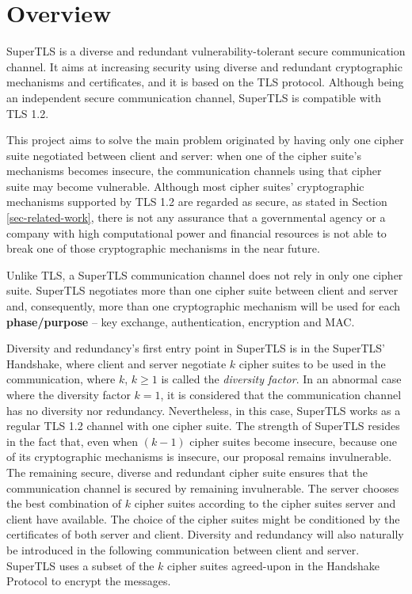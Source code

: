 \documentclass{sig-alternate-05-2015}
\begin{document}
\section{Overview}

SuperTLS is a diverse and redundant vulnerability-tolerant secure communication channel. It aims at increasing security using diverse and redundant cryptographic mechanisms and certificates, and it is based on the TLS protocol. Although being an independent secure communication channel, SuperTLS is compatible with TLS 1.2.

This project aims to solve the main problem originated by having only one cipher suite negotiated between client and server: when one of the cipher suite's mechanisms becomes insecure, the communication channels using that cipher suite may become vulnerable.
Although most cipher suites' cryptographic mechanisms supported by TLS 1.2 are regarded as secure, as stated in Section \ref{sec-related-work}, there is not any assurance that a governmental agency or a company with high computational power and financial resources is not able to break one of those cryptographic mechanisms in the near future.

Unlike TLS, a SuperTLS communication channel does not rely in only one cipher suite. SuperTLS negotiates more than one cipher suite between client and server and, consequently, more than one cryptographic mechanism will be used for each \textbf{phase/purpose} -- key exchange, authentication, encryption and MAC.

Diversity and redundancy's first entry point in SuperTLS is in the SuperTLS' Handshake, where client and server negotiate $k$ cipher suites to be used in the communication, where $k$, $k\geq1$ is called the \textit{diversity factor}. In an abnormal case where the diversity factor $k = 1$, it is considered that the communication channel has no diversity nor redundancy. Nevertheless, in this case, SuperTLS works as a regular TLS 1.2 channel with one cipher suite.
The strength of SuperTLS resides in the fact that, even when $(k - 1)$ cipher suites become insecure, because one of its cryptographic mechanisms is insecure, our proposal remains invulnerable. The remaining secure, diverse and redundant cipher suite ensures that the communication channel is secured by remaining invulnerable.
The server chooses the best combination of $k$ cipher suites according to the cipher suites server and client have available. The choice of the cipher suites might be conditioned by the certificates of both server and client.
Diversity and redundancy will also naturally be introduced in the following communication between client and server. SuperTLS uses a subset of the $k$ cipher suites agreed-upon in the Handshake Protocol to encrypt the messages.
\end{document}
